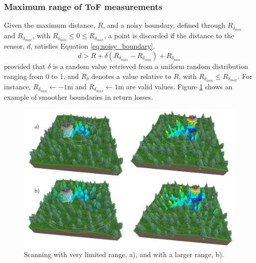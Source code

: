
\subsubsection{Maximum range of ToF measurements}

Given the maximum distance, $R$, and a noisy boundary, defined through $R_{\delta_{\textit{min}}}$ and $R_{\delta_{\textit{max}}}$, with $R_{\delta_{\textit{min}}} \leq 0 \leq R_{\delta_{\textit{max}}}$, a point is discarded if the distance to the sensor, $d$, satisfies Equation \ref{eq:noisy_boundary}.
\begin{equation}
    \label{eq:noisy_boundary}
    d > R + \delta (R_{\delta_{\textit{max}}} - R_{\delta_{\textit{min}}}) + R_{\delta_{\textit{min}}}
\end{equation}
provided that $\delta$ is a random value retrieved from a uniform random distribution ranging from 0 to 1, and $R_{\delta}$ denotes a value relative to $R$, with $R_{\delta_{\textit{min}}} \leq R_{\delta_{\textit{max}}}$. For instance, $R_{\delta_{\textit{min}}} \gets -1 $\si{\meter} and $R_{\delta_{\textit{max}}} \gets 1 $\si{\meter} are valid values. Figure \ref{fig:tls_maximum_range} shows an example of smoother boundaries in return losses.

\begin{figure}[ht]
	\centering
	\includegraphics[width=\linewidth]{figs/lidar_simulation/tls_maximum_range.png}
	\caption{Scanning with very limited range, a), and with a larger range, b).}
	\label{fig:tls_maximum_range}
\end{figure}

